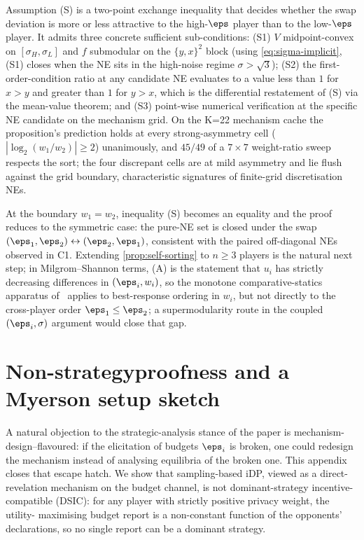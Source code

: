 Assumption (S) is a two-point exchange inequality that decides whether
the swap deviation is more or less attractive to the high-$\eps$ player
than to the low-$\eps$ player. It admits three concrete sufficient
sub-conditions: (S1) $V$ midpoint-convex on $[\sigma_H, \sigma_L]$ and
$f$ submodular on the $\{y, x\}^2$ block (using
\eqref{eq:sigma-implicit}, (S1) closes when the NE sits in the
high-noise regime $\sigma > \sqrt{3}$); (S2) the first-order-condition
ratio at any candidate NE evaluates to a value less than $1$ for
$x > y$ and greater than $1$ for $y > x$, which is the differential
restatement of (S) via the mean-value theorem; and (S3) point-wise
numerical verification at the specific NE candidate on the mechanism
grid. On the K=22 mechanism cache the proposition's prediction holds at
every strong-asymmetry cell ($|\log_2(w_1/w_2)| \ge 2$) unanimously,
and $45/49$ of a $7 \times 7$ weight-ratio sweep respects the sort; the
four discrepant cells are at mild asymmetry and lie flush against the
grid boundary, characteristic signatures of finite-grid discretisation
NEs.

At the boundary $w_1 = w_2$, inequality (S) becomes an equality and the
proof reduces to the symmetric case: the pure-NE set is closed under the
swap $(\eps_1, \eps_2) \leftrightarrow (\eps_2, \eps_1)$, consistent
with the paired off-diagonal NEs observed in C1. Extending
\cref{prop:self-sorting} to $n \ge 3$ players is the natural next step;
in Milgrom--Shannon terms, (A) is the statement that $u_i$ has strictly
decreasing differences in $(\eps_i, w_i)$, so the monotone
comparative-statics apparatus of~\cite{milgrom1994monotone} applies to
best-response ordering in $w_i$, but not directly to the cross-player
order $\eps_1 \le \eps_2$; a supermodularity route in the coupled
$(\eps_i, \sigma)$ argument would close that gap.

\section{Non-strategyproofness and a Myerson setup sketch}
\label{app:mechanism-design}

A natural objection to the strategic-analysis stance of the paper is
mechanism-design--flavoured: if the elicitation of budgets $\eps_i$ is
broken, one could redesign the mechanism instead of analysing equilibria
of the broken one. This appendix closes that escape hatch. We show that
sampling-based iDP, viewed as a direct-revelation mechanism on the
budget channel, is not dominant-strategy incentive-compatible (DSIC):
for any player with strictly positive privacy weight, the utility-
maximising budget report is a non-constant function of the opponents'
declarations, so no single report can be a dominant strategy.

